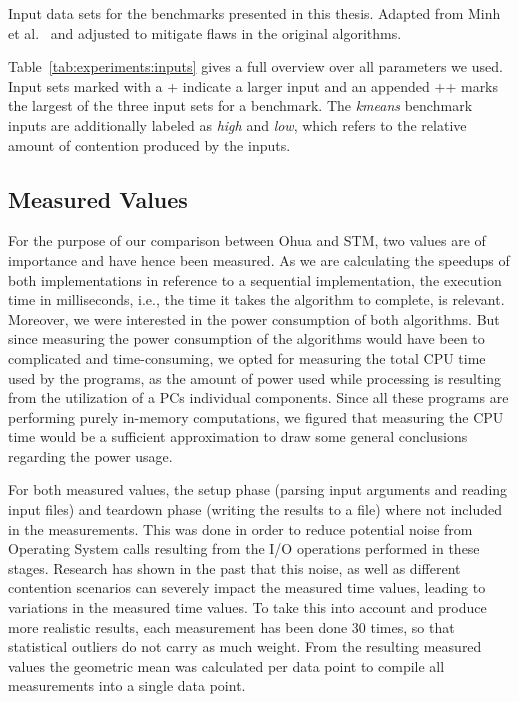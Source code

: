 \begin{table}
    \caption{Input data sets for the benchmarks presented in this thesis. Adapted from Minh et al.~\cite{minh2008stamp} and adjusted to mitigate flaws in the original algorithms.}
    \label{tab:experiments:inputs}
\end{table}

Table~\ref{tab:experiments:inputs} gives a full overview over all parameters we used.
Input sets marked with a + indicate a larger input and an appended ++ marks the largest of the three input sets for a benchmark.
The \emph{kmeans} benchmark inputs are additionally labeled as \emph{high} and \emph{low}, which refers to the relative amount of contention produced by the inputs.

\subsection{Measured Values}
\label{sec:experiments:measurements:values}

For the purpose of our comparison between Ohua and STM, two values are of importance and have hence been measured.
As we are calculating the speedups of both implementations in reference to a sequential implementation, the execution time in milliseconds, i.e., the time it takes the algorithm to complete, is relevant.
Moreover, we were interested in the power consumption of both algorithms.
But since measuring the power consumption of the algorithms would have been to complicated and time-consuming, we opted for measuring the total CPU time used by the programs, as the amount of power used while processing is resulting from the utilization of a PCs individual components.
Since all these programs are performing purely in-memory computations, we figured that measuring the CPU time would be a sufficient approximation to draw some general conclusions regarding the power usage.

For both measured values, the setup phase (parsing input arguments and reading input files) and teardown phase (writing the results to a file) where not included in the measurements.
This was done in order to reduce potential noise from Operating System calls resulting from the I/O operations performed in these stages.
Research has shown in the past that this noise, as well as different contention scenarios can severely impact the measured time values, leading to variations in the measured time values.
To take this into account and produce more realistic results, each measurement has been done 30 times, so that statistical outliers do not carry as much weight.
From the resulting measured values the geometric mean was calculated per data point to compile all measurements into a single data point.

